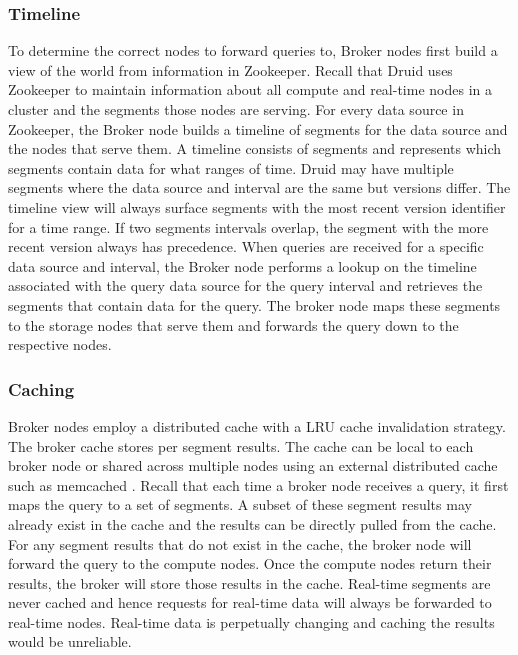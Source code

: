 \documentclass{vldb}
\begin{document}
\subsubsection{Timeline}
To determine the correct nodes to forward queries to, Broker nodes
first build a view of the world from information in Zookeeper. Recall
that Druid uses Zookeeper to maintain information about all compute
and real-time nodes in a cluster and the segments those nodes are
serving. For every data source in Zookeeper, the Broker node builds a
timeline of segments for the data source and the nodes that serve them. A timeline
consists of segments and represents which segments contain data for
what ranges of time. Druid may have multiple segments where the data
source and interval are the same but versions differ. The timeline
view will always surface segments with the most recent version
identifier for a time range. If two segments intervals overlap, the segment with the more recent
version always has precedence. When queries are received for a specific
data source and interval, the Broker node performs a lookup on the
timeline associated with the query data source for the query interval
and retrieves the segments that contain data for the query. The broker
node maps these segments to the storage nodes that serve them and
forwards the query down to the respective nodes.


\subsubsection{Caching}
\label{sec:caching}
Broker nodes employ a distributed cache with a LRU \cite{o1993lru,
kim2001lrfu} cache invalidation strategy. The broker cache stores
per segment results. The cache can be local to each broker node or
shared across multiple nodes using an external distributed cache
such as memcached \cite{fitzpatrick2004distributed}. Recall that each time a broker node receives a
query, it first maps the query to a set of segments. A subset of
these segment results may already exist in the cache and the results
can be directly pulled from the cache. For any segment results that
do not exist in the cache, the broker node will forward the query
to the compute nodes. Once the compute nodes return their results,
the broker will store those results in the cache. Real-time segments
are never cached and hence requests for real-time data will always
be forwarded to real-time nodes. Real-time data is perpetually
changing and caching the results would be unreliable.
\end{document}
